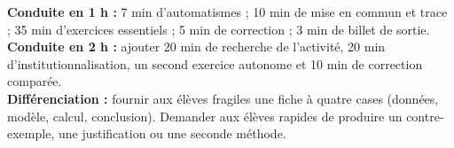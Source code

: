 \ifmxteacher
\begin{method}
\textbf{Conduite en 1 h :} 7 min d'automatismes ; 10 min de mise en commun et trace ; 35 min d'exercices essentiels ; 5 min de correction ; 3 min de billet de sortie.\\
\textbf{Conduite en 2 h :} ajouter 20 min de recherche de l'activité, 20 min d'institutionnalisation, un second exercice autonome et 10 min de correction comparée.\\
\textbf{Différenciation :} fournir aux élèves fragiles une fiche à quatre cases (données, modèle, calcul, conclusion). Demander aux élèves rapides de produire un contre-exemple, une justification ou une seconde méthode.
\end{method}
\fi

